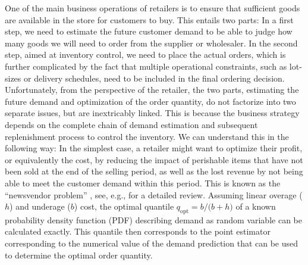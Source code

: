 \documentclass[BCOR=1mm, DIV=calc,10pt,
twoside=true,
twocolumn,
headings=normal]{scrartcl}
\begin{document}
One of the main business operations of retailers is to ensure that sufficient goods are available in the store for customers to buy. This entails two parts: In a first step, we need to estimate the future customer demand to be able to judge how many goods we will need to order from the supplier or wholesaler. In the second step, aimed at inventory control, we need to place the actual orders, which is further complicated by the fact that multiple operational constraints, such as lot-sizes or delivery schedules, need to be included in the final ordering decision. Unfortunately, from the perspective of the retailer, the two parts, estimating the future demand and optimization of the order quantity, do not factorize into two separate issues, but are inextricably linked. This is because the business strategy depends on the complete chain of demand estimation and subsequent replenishment process to control the inventory. We can understand this in the following way: In the simplest case, a retailer might want to optimize their profit, or equivalently the cost, by reducing the impact of perishable items that have not been sold at the end of the selling period, as well as the lost revenue by not being able to meet the customer demand within this period. This is known as the ``newsvendor problem'' \cite{Edgeworth}, see, e.g., \cite{Khouja1999537} for a detailed review. Assuming linear overage ($h$) and underage ($b$) cost, the optimal quantile $q_{\mathrm{opt}} = {b}/{(b+h})$ of a known probability density function (PDF) describing demand as random variable can be calculated exactly. This quantile then corresponds to the point estimator corresponding to the numerical value of the demand prediction that can be used to determine the optimal order quantity.
\end{document}

